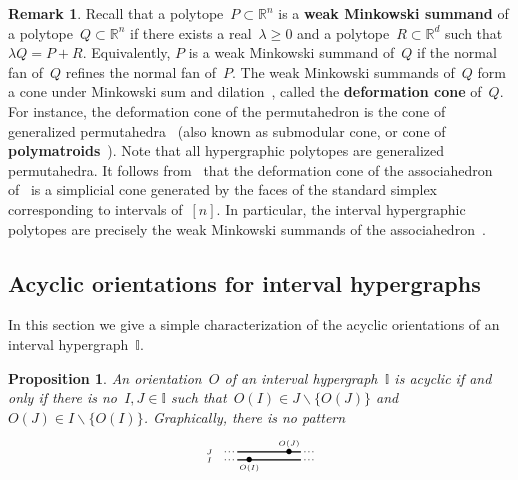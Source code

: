\documentclass{amsart}
\newtheorem{proposition}[theorem]{Proposition}
\theoremstyle{definition}
\newtheorem{remark}[theorem]{Remark}
\newcommand{\R}{\mathbb{R}} %
\newcommand{\ssm}{\smallsetminus} %
\newcommand{\defn}[1]{\textbf{\textsf{\color{PineGreen} #1}}} %
\newcommand{\II}{\mathbb I} %
\begin{document}
\begin{remark}
Recall that a polytope~$P \subset \R^n$ is a \defn{weak Minkowski summand} of a polytope~${Q \subset \R^n}$ if there exists a real~$\lambda \ge 0$ and a polytope~$R \subset \R^d$ such that~$\lambda Q = P + R$.
Equivalently, $P$ is a weak Minkowski summand of~$Q$ if the normal fan of~$Q$ refines the normal fan of~$P$.
The weak Minkowski summands of~$Q$ form a cone under Minkowski sum and dilation~\cite{McMullen-typeCone}, called the \defn{deformation cone} of~$Q$.
For instance, the deformation cone of the permutahedron is the cone of generalized permutahedra~\cite{Postnikov, PostnikovReinerWilliams} (also known as submodular cone, or cone of \defn{polymatroids}~\cite{Edmonds}).
Note that all hypergraphic polytopes are generalized permutahedra.
It follows from~\cite{BazierMatteChapelierLaguetDouvilleMousavandThomasYildirim,PadrolPaluPilaudPlamondon} that the deformation cone of the associahedron of~\cite{ShniderSternberg,Loday} is a simplicial cone generated by the faces of the standard simplex corresponding to intervals of~$[n]$.
In particular, the interval hypergraphic polytopes are precisely the weak Minkowski summands of the associahedron~\cite{ShniderSternberg,Loday}.
\end{remark}


\subsection{Acyclic orientations for interval hypergraphs}
\label{subsec:acyclicI}

In this section we give a simple characterization of the acyclic orientations of an interval hypergraph~$\II$.

\begin{proposition}
\label{prop:acyclicI}
An orientation~$O$ of an interval hypergraph~$\II$ is acyclic if and only if there is no~$I,J \in \II$ such that~$O(I) \in J \ssm \{O(J)\}$ and~$O(J) \in I \ssm \{O(I)\}$.
Graphically, there is no pattern
 \[
	\begin{tikzpicture}[scale=1,baseline=.0cm]
	\node at (-.5,0.2) {$\scriptscriptstyle J$}; 
	\node at (-.1,0.2) {$\scriptstyle \cdot$};
	\node at (0,0.2) {$\scriptstyle \cdot$};
	\node at (.1,0.2) {$\scriptstyle \cdot$};
	\draw [thick] (.2,.2)--(1.8,.2);
	\node at (1.9,.2) {$\scriptstyle \cdot$};
	\node at (2,.2) {$\scriptstyle \cdot$};
	\node at (2.1,.2) {$\scriptstyle \cdot$};
	\node at (1.5,.2) {$\bullet$};
	\node at (-.5,0) {$\scriptscriptstyle I$};
	\node at (-.1,0) {$\scriptstyle \cdot$};
	\node at (0,0) {$\scriptstyle \cdot$};
	\node at (.1,0) {$\scriptstyle \cdot$};
	\draw [thick] (.2,0)--(1.8,0);
	\node at (1.9,0) {$\scriptstyle \cdot$};
	\node at (2,0) {$\scriptstyle \cdot$};
	\node at (2.1,0) {$\scriptstyle \cdot$};
	\node at (.5,0) {$\bullet$};
	\node at (.5,-.2) {$\scriptscriptstyle O(I)$};
	\node at (1.5,.4) {$\scriptscriptstyle O(J)$}; 
	\end{tikzpicture}
\]
\end{proposition}
\end{document}
